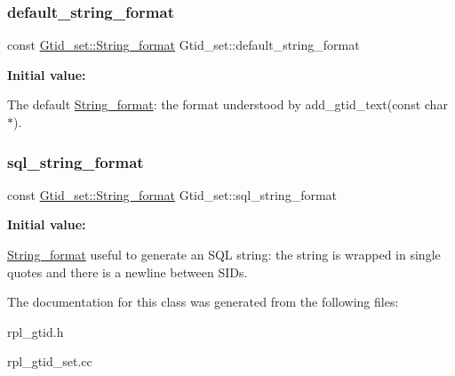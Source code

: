 \subsubsection{\texorpdfstring{default\+\_\+string\+\_\+format}{default\_string\_format}}
{\footnotesize\ttfamily const \mbox{\hyperlink{structGtid__set_1_1String__format}{Gtid\+\_\+set\+::\+String\+\_\+format}} Gtid\+\_\+set\+::default\+\_\+string\+\_\+format\hspace{0.3cm}{\ttfamily [static]}}

{\bfseries Initial value\+:}
\begin{DoxyCode}{0}
\DoxyCodeLine{=}
\DoxyCodeLine{\{}
\DoxyCodeLine{  \textcolor{stringliteral}{""}, \textcolor{stringliteral}{""}, \textcolor{stringliteral}{":"}, \textcolor{stringliteral}{"-"}, \textcolor{stringliteral}{":"}, \textcolor{stringliteral}{",\(\backslash\)n"}, \textcolor{stringliteral}{""},}
\DoxyCodeLine{\}}
\end{DoxyCode}
The default \mbox{\hyperlink{structGtid__set_1_1String__format}{String\+\_\+format}}\+: the format understood by add\+\_\+gtid\+\_\+text(const char $\ast$). \mbox{\label{classGtid__set_abefb12fa60900cd38a8abe959b774f54}} 
\subsubsection{\texorpdfstring{sql\+\_\+string\+\_\+format}{sql\_string\_format}}
{\footnotesize\ttfamily const \mbox{\hyperlink{structGtid__set_1_1String__format}{Gtid\+\_\+set\+::\+String\+\_\+format}} Gtid\+\_\+set\+::sql\+\_\+string\+\_\+format\hspace{0.3cm}{\ttfamily [static]}}

{\bfseries Initial value\+:}
\begin{DoxyCode}{0}
\DoxyCodeLine{=}
\DoxyCodeLine{\{}
\DoxyCodeLine{  \textcolor{stringliteral}{"'"}, \textcolor{stringliteral}{"'"}, \textcolor{stringliteral}{":"}, \textcolor{stringliteral}{"-"}, \textcolor{stringliteral}{":"}, \textcolor{stringliteral}{"',\(\backslash\)n'"}, \textcolor{stringliteral}{"''"},}
\DoxyCodeLine{\}}
\end{DoxyCode}
\mbox{\hyperlink{structGtid__set_1_1String__format}{String\+\_\+format}} useful to generate an S\+QL string\+: the string is wrapped in single quotes and there is a newline between S\+I\+Ds. 

The documentation for this class was generated from the following files\+:\begin{DoxyCompactItemize}
\item 
rpl\+\_\+gtid.\+h\item 
rpl\+\_\+gtid\+\_\+set.\+cc\end{DoxyCompactItemize}
